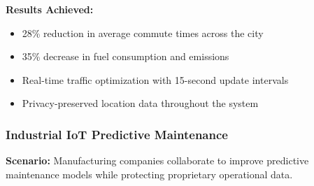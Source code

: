 \textbf{Results Achieved:}
\begin{itemize}
    \item 28\% reduction in average commute times across the city
    \item 35\% decrease in fuel consumption and emissions
    \item Real-time traffic optimization with 15-second update intervals
    \item Privacy-preserved location data throughout the system
\end{itemize}

\subsubsection{Industrial IoT Predictive Maintenance}

\textbf{Scenario:} Manufacturing companies collaborate to improve predictive maintenance models while protecting proprietary operational data.

